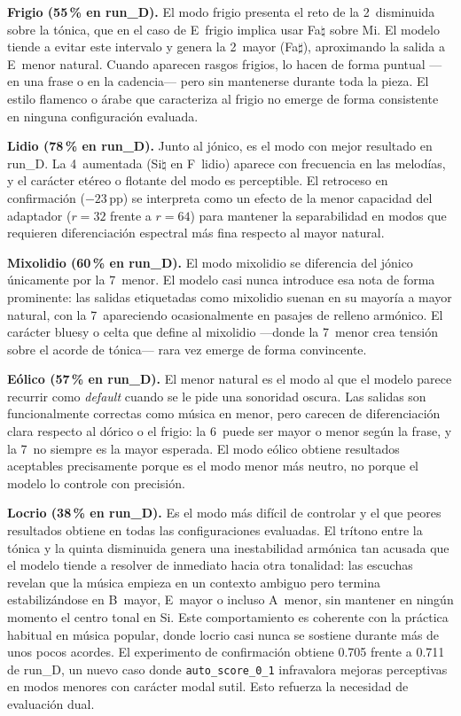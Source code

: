 \documentclass[%
    school=etsisi,%
    type=pfg,%
    degree=61CD,%
]{upm-report}
\begin{document}
\textbf{Frigio (55\,\% en run\_D).} El modo frigio presenta el reto de la 2\textordfeminine\ disminuida sobre la t\'onica, que en el caso de E~frigio implica usar Fa$\natural$ sobre Mi. El modelo tiende a evitar este intervalo y genera la 2\textordfeminine\ mayor (Fa$\sharp$), aproximando la salida a E~menor natural. Cuando aparecen rasgos frigios, lo hacen de forma puntual ---en una frase o en la cadencia--- pero sin mantenerse durante toda la pieza. El estilo flamenco o \'arabe que caracteriza al frigio no emerge de forma consistente en ninguna configuraci\'on evaluada.

\textbf{Lidio (78\,\% en run\_D).} Junto al j\'onico, es el modo con mejor resultado en run\_D. La 4\textordfeminine\ aumentada (Si$\natural$ en F~lidio) aparece con frecuencia en las melodías, y el car\'acter et\'ereo o flotante del modo es perceptible. El retroceso en confirmaci\'on ($-23$\,pp) se interpreta como un efecto de la menor capacidad del adaptador ($r=32$ frente a $r=64$) para mantener la separabilidad en modos que requieren diferenciaci\'on espectral m\'as fina respecto al mayor natural.

\textbf{Mixolidio (60\,\% en run\_D).} El modo mixolidio se diferencia del j\'onico \'unicamente por la 7\textordfeminine\ menor. El modelo casi nunca introduce esa nota de forma prominente: las salidas etiquetadas como mixolidio suenan en su mayor\'ia a mayor natural, con la 7\textordfeminine\ apareciendo ocasionalmente en pasajes de relleno arm\'onico. El car\'acter bluesy o celta que define al mixolidio ---donde la 7\textordfeminine\ menor crea tensi\'on sobre el acorde de t\'onica--- rara vez emerge de forma convincente.

\textbf{E\'olico (57\,\% en run\_D).} El menor natural es el modo al que el modelo parece recurrir como \textit{default} cuando se le pide una sonoridad oscura. Las salidas son funcionalmente correctas como m\'usica en menor, pero carecen de diferenciaci\'on clara respecto al d\'orico o el frigio: la 6\textordfeminine\ puede ser mayor o menor seg\'un la frase, y la 7\textordfeminine\ no siempre es la mayor esperada. El modo e\'olico obtiene resultados aceptables precisamente porque es el modo menor m\'as neutro, no porque el modelo lo controle con precisi\'on.

\textbf{Locrio (38\,\% en run\_D).} Es el modo m\'as dif\'icil de controlar y el que peores resultados obtiene en todas las configuraciones evaluadas. El tr\'itono entre la t\'onica y la quinta disminuida genera una inestabilidad arm\'onica tan acusada que el modelo tiende a resolver de inmediato hacia otra tonalidad: las escuchas revelan que la m\'usica empieza en un contexto ambiguo pero termina estabiliz\'andose en B~mayor, E~mayor o incluso A~menor, sin mantener en ning\'un momento el centro tonal en Si. Este comportamiento es coherente con la pr\'actica habitual en m\'usica popular, donde locrio casi nunca se sostiene durante m\'as de unos pocos acordes. El experimento de confirmaci\'on obtiene 0.705 frente a 0.711 de run\_D, un nuevo caso donde \texttt{auto\_score\_0\_1} infravalora mejoras perceptivas en modos menores con car\'acter modal sutil. Esto refuerza la necesidad de evaluaci\'on dual.
\end{document}
